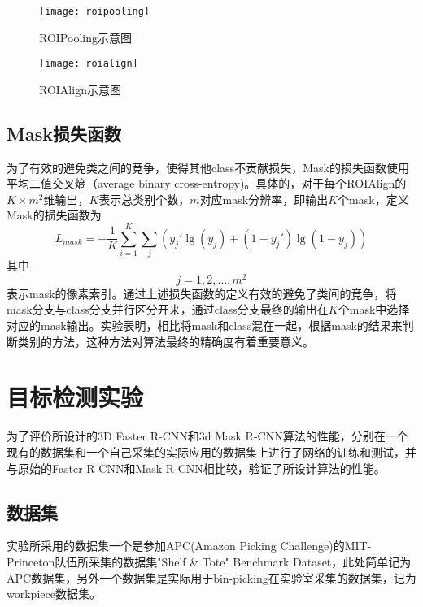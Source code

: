 \begin{figure}[ht]
  \centering
  \texttt{[image: roipooling]}
  \caption{ROIPooling示意图}
  \label{fig:roipooling}
\end{figure}
\begin{figure}[ht]
  \centering
  \texttt{[image: roialign]}
  \caption{ROIAlign示意图}
  \label{fig:roialign}
\end{figure}

\subsection{Mask损失函数}
为了有效的避免类之间的竞争，使得其他class不贡献损失，Mask的损失函数使用平均二值交叉熵（average binary cross-entropy)。具体的，对于每个ROIAlign的$K\times m^2$维输出，$K$表示总类别个数，$m$对应mask分辨率，即输出$K$个mask，定义Mask的损失函数为
\begin{equation}
  L_{mask} = -\frac{1}{K}\sum_{i=1}^K{\sum_j{(y_j'\lg(y_j)+(1-y_j')\lg(1-y_j))}}
\end{equation}
其中
\begin{equation}
  j = 1,2,\ldots,m^2
\end{equation}
表示mask的像素索引。通过上述损失函数的定义有效的避免了类间的竞争，将mask分支与class分支并行区分开来，通过class分支最终的输出在$K$个mask中选择对应的mask输出。实验表明，相比将mask和class混在一起，根据mask的结果来判断类别的方法，这种方法对算法最终的精确度有着重要意义。

\section{目标检测实验}
为了评价所设计的3D Faster R-CNN和3d Mask R-CNN算法的性能，分别在一个现有的数据集和一个自己采集的实际应用的数据集上进行了网络的训练和测试，并与原始的Faster R-CNN和Mask R-CNN相比较，验证了所设计算法的性能。

\subsection{数据集}
\label{sec:dataset}
实验所采用的数据集一个是参加APC(Amazon Picking Challenge)的MIT-Princeton队伍所采集的数据集"Shelf \& Tote" Benchmark Dataset\cite{apcdataset}，此处简单记为APC数据集，另外一个数据集是实际用于bin-picking在实验室采集的数据集，记为workpiece数据集。

